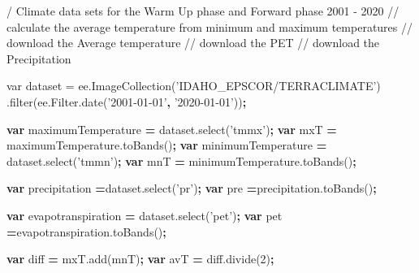 \documentclass[
  10pt,
  b5paper,
]{book}
\newenvironment{Shaded}{\begin{snugshade}}{\end{snugshade}}
\newcommand{\AttributeTok}[1]{\textcolor[rgb]{0.77,0.63,0.00}{#1}}
\newcommand{\DecValTok}[1]{\textcolor[rgb]{0.00,0.00,0.81}{#1}}
\newcommand{\KeywordTok}[1]{\textcolor[rgb]{0.13,0.29,0.53}{\textbf{#1}}}
\newcommand{\NormalTok}[1]{#1}
\newcommand{\OperatorTok}[1]{\textcolor[rgb]{0.81,0.36,0.00}{\textbf{#1}}}
\newcommand{\SpecialCharTok}[1]{\textcolor[rgb]{0.00,0.00,0.00}{#1}}
\newcommand{\SpecialStringTok}[1]{\textcolor[rgb]{0.31,0.60,0.02}{#1}}
\newcommand{\StringTok}[1]{\textcolor[rgb]{0.31,0.60,0.02}{#1}}
\newcommand{\VariableTok}[1]{\textcolor[rgb]{0.00,0.00,0.00}{#1}}
\begin{document}
\begin{Shaded}
\begin{Highlighting}[]
\SpecialStringTok{/ Climate data sets for the Warm Up phase and Forward phase 2001 - 2020}
\SpecialStringTok{// calculate the average temperature from minimum and maximum temperatures}
\SpecialStringTok{// download the Average temperature}
\SpecialStringTok{// download the PET }
\SpecialStringTok{// download the Precipitation}

\SpecialStringTok{var dataset = ee.ImageCollection}\SpecialCharTok{(}\SpecialStringTok{'IDAHO_EPSCOR/TERRACLIMATE}\StringTok{')}
\NormalTok{                  .}\AttributeTok{filter}\NormalTok{(}\VariableTok{ee}\NormalTok{.}\VariableTok{Filter}\NormalTok{.}\AttributeTok{date}\NormalTok{(}\StringTok{'2001-01-01'}\OperatorTok{,} \StringTok{'2020-01-01'}\NormalTok{))}\OperatorTok{;}

\KeywordTok{var}\NormalTok{ maximumTemperature }\OperatorTok{=} \VariableTok{dataset}\NormalTok{.}\AttributeTok{select}\NormalTok{(}\StringTok{'tmmx'}\NormalTok{)}\OperatorTok{;}
\KeywordTok{var}\NormalTok{ mxT }\OperatorTok{=} \VariableTok{maximumTemperature}\NormalTok{.}\AttributeTok{toBands}\NormalTok{()}\OperatorTok{;}
\KeywordTok{var}\NormalTok{ minimumTemperature }\OperatorTok{=} \VariableTok{dataset}\NormalTok{.}\AttributeTok{select}\NormalTok{(}\StringTok{'tmmn'}\NormalTok{)}\OperatorTok{;}
\KeywordTok{var}\NormalTok{ mnT }\OperatorTok{=} \VariableTok{minimumTemperature}\NormalTok{.}\AttributeTok{toBands}\NormalTok{()}\OperatorTok{;}

\KeywordTok{var}\NormalTok{ precipitation }\OperatorTok{=}\VariableTok{dataset}\NormalTok{.}\AttributeTok{select}\NormalTok{(}\StringTok{'pr'}\NormalTok{)}\OperatorTok{;}
\KeywordTok{var}\NormalTok{ pre }\OperatorTok{=}\VariableTok{precipitation}\NormalTok{.}\AttributeTok{toBands}\NormalTok{()}\OperatorTok{;}

\KeywordTok{var}\NormalTok{ evapotranspiration }\OperatorTok{=} \VariableTok{dataset}\NormalTok{.}\AttributeTok{select}\NormalTok{(}\StringTok{'pet'}\NormalTok{)}\OperatorTok{;}
\KeywordTok{var}\NormalTok{ pet }\OperatorTok{=}\VariableTok{evapotranspiration}\NormalTok{.}\AttributeTok{toBands}\NormalTok{()}\OperatorTok{;}

\KeywordTok{var}\NormalTok{ diff }\OperatorTok{=} \VariableTok{mxT}\NormalTok{.}\AttributeTok{add}\NormalTok{(mnT)}\OperatorTok{;}
\KeywordTok{var}\NormalTok{ avT }\OperatorTok{=} \VariableTok{diff}\NormalTok{.}\AttributeTok{divide}\NormalTok{(}\DecValTok{2}\NormalTok{)}\OperatorTok{;}


\end{Highlighting}
\end{Shaded}
\end{document}
